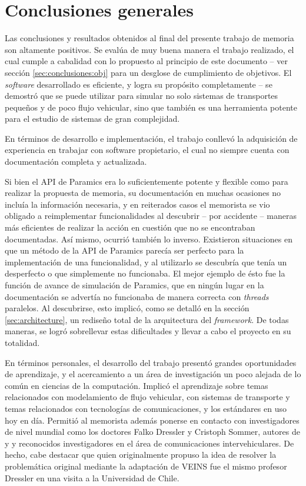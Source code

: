 \section{Conclusiones generales}

Las conclusiones y resultados obtenidos al final del presente trabajo de memoria son altamente positivos. Se evalúa de muy buena manera el trabajo realizado, el cual cumple a cabalidad con lo propuesto al principio de este documento -- ver sección \ref{sec:conclusiones:obj} para un desglose de cumplimiento de objetivos. El \emph{software} desarrollado es eficiente, y logra su propósito completamente -- se demostró que se puede utilizar para simular no solo sistemas de transportes pequeños y de poco flujo vehicular, sino que también es una herramienta potente para el estudio de sistemas de gran complejidad.

En términos de desarrollo e implementación, el trabajo conllevó la adquisición de experiencia en trabajar con software propietario, el cual no siempre cuenta con documentación completa y actualizada. 

Si bien el API de Paramics era lo suficientemente potente y flexible como para realizar la propuesta de memoria, su documentación en muchas ocasiones no incluía la información necesaria, y en reiterados casos el memorista se vio obligado a reimplementar funcionalidades al descubrir -- por accidente -- maneras más eficientes de realizar la acción en cuestión que no se encontraban documentadas. 
Así mismo, ocurrió también lo inverso. Existieron situaciones en que un método de la API de Paramics parecía ser perfecto para la implementación de una funcionalidad, y al utilizarlo se descubría que tenía un desperfecto o que simplemente no funcionaba. El mejor ejemplo de ésto fue la función de avance de simulación de Paramics, que en ningún lugar en la documentación se advertía no funcionaba de manera correcta con \emph{threads} paralelos. Al descubrirse, esto implicó, como se detalló en la sección \ref{sec:architecture}, un rediseño total de la arquitectura del \emph{framework}. De todas maneras, se logró sobrellevar estas dificultades y llevar a cabo el proyecto en su totalidad.

En términos personales, el desarrollo del trabajo presentó grandes oportunidades de aprendizaje, y el acercamiento a un área de investigación un poco alejada de lo común en ciencias de la computación. Implicó el aprendizaje sobre temas relacionados con modelamiento de flujo vehicular, con sistemas de transporte y temas relacionados con tecnologías de comunicaciones, y los estándares en uso hoy en día. Permitió al memorista además ponerse en contacto con investigadores de nivel mundial como los doctores Falko Dressler y Cristoph Sommer, autores de \autocite{sommer_german_dressler} y \autocite{sommer_dressler2} y reconocidos investigadores en el área de comunicaciones intervehiculares. De hecho, cabe destacar que quien originalmente propuso la idea de resolver la problemática original mediante la adaptación de VEINS fue el mismo profesor Dressler en una visita a la Universidad de Chile.

